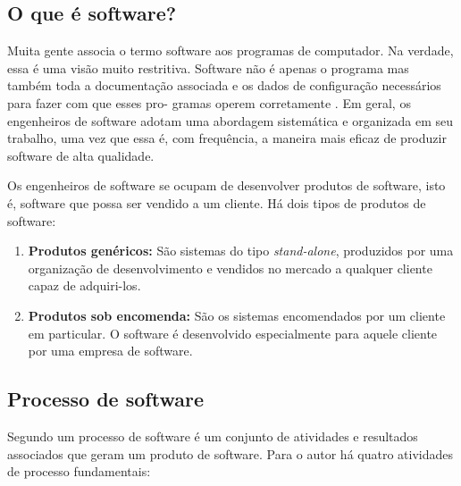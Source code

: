 \subsection{O que é software?}

Muita gente associa o termo software aos programas de computador. Na verdade, essa é uma visão muito restritiva. Software não é apenas o programa mas também toda a documentação associada e os dados de configuração necessários para fazer com que esses pro- gramas operem corretamente \cite{sommerville2003engenharia}. Em geral, os engenheiros de software adotam uma abordagem sistemática e organizada em seu trabalho, uma vez que essa é, com frequência, a maneira mais eficaz de produzir software de alta qualidade.

Os engenheiros de software se ocupam de desenvolver produtos de software, isto é, software que possa ser vendido a um cliente. Há dois tipos de produtos de software:

\begin{enumerate}
	\item \textbf{Produtos genéricos:} São sistemas do tipo \textit{stand-alone}, produzidos por uma organização de desenvolvimento e vendidos no mercado a qualquer cliente capaz de adquiri-los. 
	\item \textbf{Produtos sob encomenda:} São os sistemas encomendados por um cliente em particular. O software é desenvolvido especialmente para aquele cliente por uma empresa de software.
\end{enumerate}

\subsection{Processo de software}

Segundo  um processo de software é um conjunto de atividades e resultados associados que geram um produto de software. Para o autor há quatro atividades de processo fundamentais:

